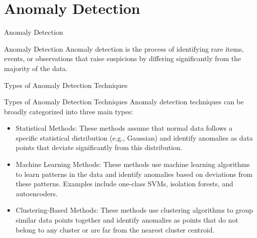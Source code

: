 \documentclass[hyperref={pdfpagelabels=false},aspectratio=169]{beamer}
\begin{document}
\section{Anomaly Detection}
\label{sec:orgdc722e7}
\begin{frame}[label={sec:orgf7469a9}]{Anomaly Detection}
\begin{block}{Anomaly Detection}
\pause
\alert{Anomaly detection} is the process of identifying rare items, events, or observations that raise suspicions by differing significantly from the majority of the data.
\end{block}
\end{frame}
\begin{frame}[label={sec:org519819b}]{Types of Anomaly Detection Techniques}
\begin{block}{Types of Anomaly Detection Techniques}
\pause
Anomaly detection techniques can be broadly categorized into three main types:
\begin{itemize}[<+->]
\item \alert{Statistical Methods}: These methods assume that normal data follows a specific statistical distribution (e.g., Gaussian) and identify anomalies as data points that deviate significantly from this distribution.
\item \alert{Machine Learning Methods}: These methods use machine learning algorithms to learn patterns in the data and identify anomalies based on deviations from these patterns. Examples include one-class SVMs, isolation forests, and autoencoders.
\item \alert{Clustering-Based Methods}: These methods use clustering algorithms to group similar data points together and identify anomalies as points that do not belong to any cluster or are far from the nearest cluster centroid.
\end{itemize}
\end{block}
\end{frame}
\end{document}
